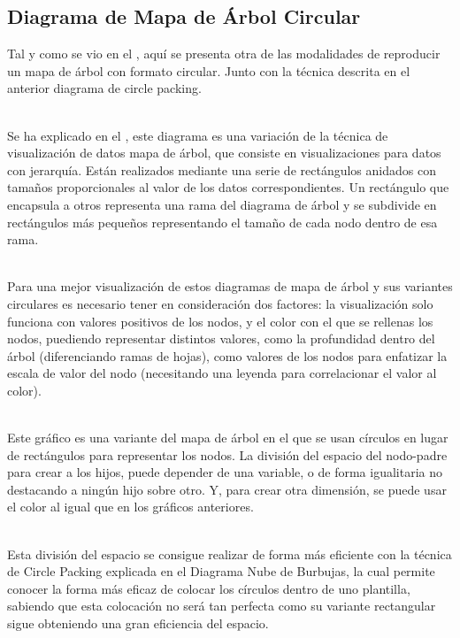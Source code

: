 \documentclass{article}\usepackage[]{graphicx}\usepackage[]{color}
\begin{document}
\subsection{Diagrama de Mapa de \'Arbol Circular}
Tal y como se vio en el , aqu\'i se presenta otra de las modalidades de reproducir un mapa de \'arbol con formato circular. Junto con la t\'ecnica descrita en el anterior diagrama de circle packing\cite{pack-book}.~\\~\par
Se ha explicado en el , este diagrama es una variaci\'on de la t\'ecnica de visualizaci\'on de datos mapa de \'arbol, que consiste en visualizaciones para datos con jerarqu\'ia. Est\'an realizados mediante una serie de rect\'angulos anidados con tama\~nos proporcionales al valor de los datos correspondientes. Un rect\'angulo que encapsula a otros representa una rama del diagrama de \'arbol y se subdivide en rect\'angulos m\'as peque\~nos representando el tama\~no de cada nodo dentro de esa rama\cite{tree-map}.~\\~\par
Para una mejor visualizaci\'on de estos diagramas de mapa de \'arbol y sus variantes circulares es necesario tener en consideraci\'on dos factores: la visualizaci\'on solo funciona con valores positivos de los nodos, y el color con el que se rellenas los nodos, puediendo representar distintos valores, como la profundidad dentro del \'arbol (diferenciando ramas de hojas), como valores de los nodos para enfatizar la escala de valor del nodo (necesitando una leyenda para correlacionar el valor al color)\cite{tree-map}.~\\~\par
Este gr\'afico es una variante del mapa de \'arbol en el que se usan c\'irculos en lugar de rect\'angulos para representar los nodos. La divisi\'on del espacio del nodo-padre para crear a los hijos, puede depender de una variable, o de forma igualitaria no destacando a ning\'un hijo sobre otro. Y, para crear otra dimensi\'on, se puede usar el color al igual que en los gr\'aficos anteriores.~\\~\par
Esta divisi\'on del espacio se consigue realizar de forma m\'as eficiente con la t\'ecnica de Circle Packing\cite{pack-book} explicada en el Diagrama Nube de Burbujas, la cual permite conocer la forma m\'as eficaz de colocar los c\'irculos dentro de uno plantilla, sabiendo que esta colocaci\'on no ser\'a tan perfecta como su variante rectangular sigue obteniendo una gran eficiencia del espacio.~\\~\par
\end{document}
